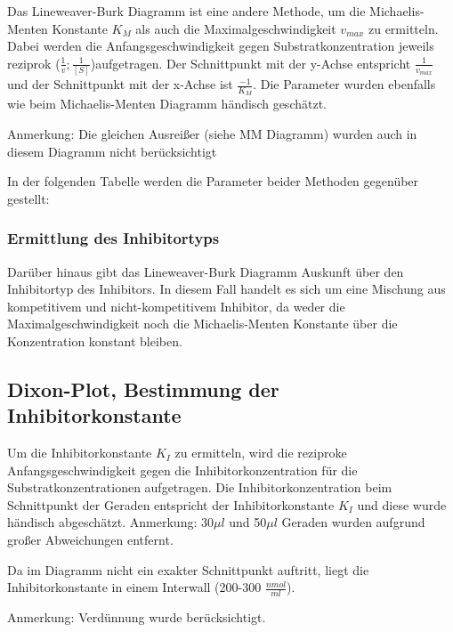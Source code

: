 Das Lineweaver-Burk Diagramm ist eine andere Methode, um die Michaelis-Menten Konstante $K_M$ als auch die Maximalgeschwindigkeit $v_{max}$ zu ermitteln. Dabei werden die Anfangsgeschwindigkeit gegen Substratkonzentration jeweils reziprok ($ \frac{1}{v};\frac{1}{[S]} $)aufgetragen.
Der Schnittpunkt mit der y-Achse entspricht $\frac{1}{v_{max}}$ und der Schnittpunkt mit der x-Achse ist $\frac{-1}{K_M}$. Die Parameter wurden ebenfalls wie beim Michaelis-Menten Diagramm händisch geschätzt. 

Anmerkung: Die gleichen Ausreißer (siehe MM Diagramm) wurden auch in diesem Diagramm nicht berücksichtigt


In der folgenden Tabelle werden die Parameter beider Methoden gegenüber gestellt:



\subsubsection{Ermittlung des Inhibitortyps}

Darüber hinaus gibt das Lineweaver-Burk Diagramm Auskunft über den Inhibitortyp des Inhibitors. 
In diesem Fall handelt es sich um eine Mischung aus kompetitivem und nicht-kompetitivem Inhibitor, da weder die Maximalgeschwindigkeit noch die Michaelis-Menten Konstante über die Konzentration konstant bleiben.

\subsection{Dixon-Plot, Bestimmung der Inhibitorkonstante}

Um die Inhibitorkonstante $K_I$ zu ermitteln, wird die reziproke Anfangsgeschwindigkeit gegen die Inhibitorkonzentration für die Substratkonzentrationen aufgetragen. Die Inhibitorkonzentration beim Schnittpunkt der Geraden entspricht der Inhibitorkonstante $K_I$ und diese wurde händisch abgeschätzt. 
Anmerkung: 30$\mu l$ und 50$\mu l$ Geraden wurden aufgrund großer Abweichungen entfernt.


Da im Diagramm nicht ein exakter Schnittpunkt auftritt, liegt die Inhibitorkonstante in einem Interwall (200-300 $\frac{nmol}{ml}$).

Anmerkung: Verdünnung wurde berücksichtigt.


